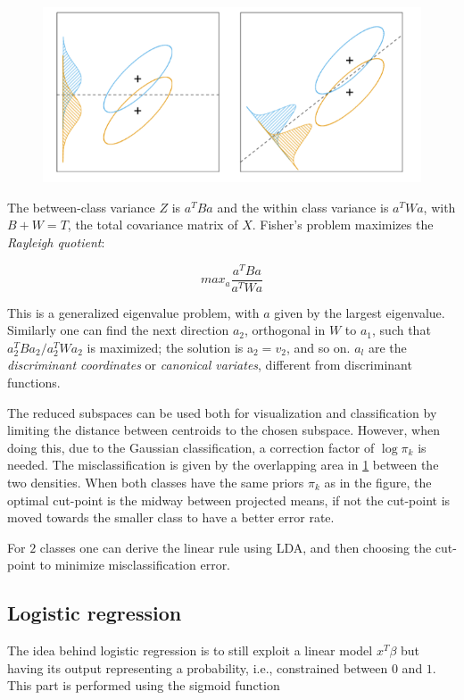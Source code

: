 \documentclass[12pt, letterpaper]{article}
\theoremstyle{definition}
\begin{document}
\begin{figure}
\label{cov}
\includegraphics[scale=0.4]{img/cov}
\end{figure}

The between-class variance $Z$ is $a^TBa$ and the within class variance is $a^TWa$, with $B+W=T$, the total covariance matrix of $X$.
Fisher's problem maximizes the \textit{Rayleigh quotient}:

\begin{equation}
max_{a} \frac{a^TBa}{a^TWa}
\end{equation}

This is a generalized eigenvalue problem, with $a$ given by the largest eigenvalue. Similarly one can find the next direction $a_2$, orthogonal in $W$ to $a_1$, such that $a^T_2 Ba_2/a^T_2 Wa_2$ is maximized; the solution is a$_2 = v_2$, and so on. $a_l$ are the \textit{discriminant coordinates} or \textit{canonical variates}, different from discriminant functions.

The reduced subspaces can be used both for visualization and classification by limiting the distance between centroids to the chosen subspace. However, when doing this, due to the Gaussian classification, a correction factor of $\log \pi_k$ is needed. The misclassification is given by the overlapping area in \ref{cov} between the two densities. When both classes have the same priors $\pi_k$ as in the figure, the optimal cut-point is the midway between projected means, if not the cut-point is moved towards the smaller class to have a better error rate.

For $2$ classes one can derive the linear rule using LDA, and then choosing the cut-point to minimize misclassification error.

\subsection{Logistic regression}
The idea behind logistic regression is to still exploit a linear model $x^T\beta$ but having its output representing a probability, i.e., constrained between $0$ and $1$. This part is performed using the sigmoid function
\end{document}
